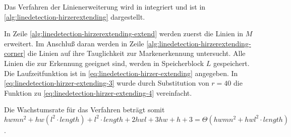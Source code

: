 Das Verfahren der Linienerweiterung wird in  integriert und ist in
 \autoref{alg:linedetection-hirzerextending} dargestellt.

In Zeile \ref{alg:linedetection-hirzerextending-extend} werden zuerst die Linien in $M$ erweitert. Im Anschluß daran
 werden in Zeile \ref{alg:linedetection-hirzerextending-corner} die Linien auf ihre Tauglichkeit zur Markenerkennung
 untersucht. Alle Linien die zur Erkennung geeignet sind, werden in Speicherblock $L$ gespeichert. Die Laufzeitfunktion
 ist in \autoref{eq:linedetection-hirzer-extending} angegeben. In \autoref{eq:linedetection-hirzer-extending-3} wurde
 durch Substitution von  $r = 40$ die Funktion zu \autoref{eq:linedetection-hirzer-extending-4} vereinfacht.

Die Wachstumsrate für das Verfahren beträgt somit
$hwmn^2 + hw(l^2\cdot\mathit{length}) + l^2\cdot\mathit{length} + 2hwl + 3hw + h + 3
 = \Theta(hwmn^2 + hwl^2\cdot\mathit{length})$.
